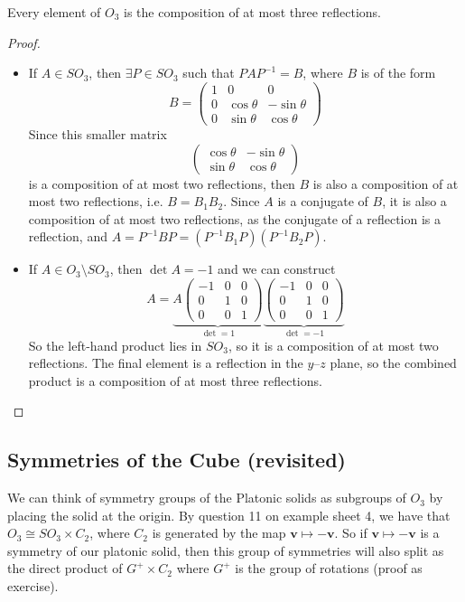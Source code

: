 \documentclass{article}
\begin{document}
	\begin{corollary}
		Every element of $O_3$ is the composition of at most three reflections.
	\end{corollary}
	\begin{proof}
		\begin{itemize}
			\item If $A \in SO_3$, then $\exists P \in SO_3$ such that $PAP^{-1} = B$, where $B$ is of the form
			\[ B = \begin{pmatrix}
				1 & 0 & 0 \\
				0 & \cos \theta & -\sin \theta \\
				0 & \sin \theta & \cos \theta
			\end{pmatrix} \]
			Since this smaller matrix
			\[ \begin{pmatrix}
				\cos \theta & -\sin \theta \\
				\sin \theta & \cos \theta
			\end{pmatrix} \]
			is a composition of at most two reflections, then $B$ is also a composition of at most two reflections, i.e. $B = B_1 B_2$. Since $A$ is a conjugate of $B$, it is also a composition of at most two reflections, as the conjugate of a reflection is a reflection, and $A = P^{-1}BP = (P^{-1}B_1P)(P^{-1}B_2P)$.
			\item If $A \in O_3 \setminus SO_3$, then $\det A = -1$ and we can construct
			\[ A = \underbrace{A\begin{pmatrix}
				-1 & 0 & 0 \\
				0 & 1 & 0 \\
				0 & 0 & 1
			\end{pmatrix}}_{\det = 1}\underbrace{\begin{pmatrix}
				-1 & 0 & 0 \\
				0 & 1 & 0 \\
				0 & 0 & 1
			\end{pmatrix}}_{\det = -1} \]
			So the left-hand product lies in $SO_3$, so it is a composition of at most two reflections. The final element is a reflection in the $y$--$z$ plane, so the combined product is a composition of at most three reflections.
		\end{itemize}
	\end{proof}

	\subsection{Symmetries of the Cube (revisited)}
	We can think of symmetry groups of the Platonic solids as subgroups of $O_3$ by placing the solid at the origin. By question 11 on example sheet 4, we have that $O_3 \cong SO_3 \times C_2$, where $C_2$ is generated by the map $\bm v \mapsto -\bm v$. So if $\bm v\mapsto -\bm v$ is a symmetry of our platonic solid, then this group of symmetries will also split as the direct product of $G^+ \times C_2$ where $G^+$ is the group of rotations (proof as exercise).
\end{document}
